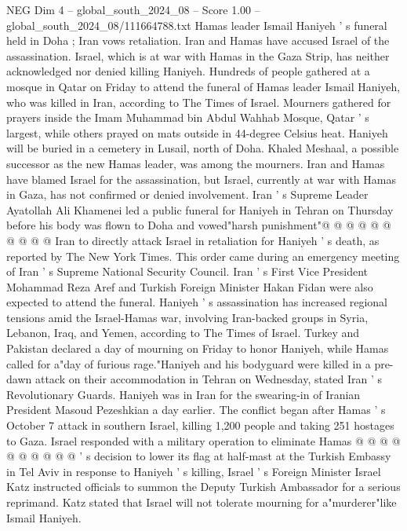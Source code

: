 \begin{textsample}{NEG Dim 4 – global\_south\_2024\_08 – Score 1.00 – global\_south\_2024\_08/111664788.txt}  \label{ex:f4_neg_340}
Hamas leader Ismail Haniyeh ' s funeral held in Doha ; Iran vows retaliation.
Iran and Hamas have accused Israel of the assassination.
Israel, which is at war with Hamas in the Gaza Strip, has neither acknowledged nor denied killing Haniyeh.
Hundreds of people gathered at a mosque in Qatar on Friday to attend the funeral of Hamas leader Ismail Haniyeh, who was killed in Iran, according to The Times of Israel.
Mourners gathered for prayers inside the Imam Muhammad bin Abdul Wahhab Mosque, Qatar ' s largest, while others prayed on mats outside in 44-degree Celsius heat.
Haniyeh will be buried in a cemetery in Lusail, north of Doha.
Khaled Meshaal, a possible successor as the new Hamas leader, was among the mourners.
Iran and Hamas have blamed Israel for the assassination, but Israel, currently at war with Hamas in Gaza, has not confirmed or denied involvement.
Iran ' s Supreme Leader Ayatollah Ali Khamenei led a public funeral for Haniyeh in Tehran on Thursday before his body was flown to Doha and vowed"harsh punishment"@ @ @ @ @ @ @ @ @ @ Iran to directly attack Israel in retaliation for Haniyeh ' s death, as reported by The New York Times.
This order came during an emergency meeting of Iran ' s Supreme National Security Council.
Iran ' s First Vice President Mohammad Reza Aref and Turkish Foreign Minister Hakan Fidan were also expected to attend the funeral.
Haniyeh ' s assassination has increased regional tensions amid the Israel-Hamas war, involving Iran-backed groups in Syria, Lebanon, Iraq, and Yemen, according to The Times of Israel.
Turkey and Pakistan declared a day of mourning on Friday to honor Haniyeh, while Hamas called for a"day of furious rage."Haniyeh and his bodyguard were killed in a pre-dawn attack on their accommodation in Tehran on Wednesday, stated Iran ' s Revolutionary Guards.
Haniyeh was in Iran for the swearing-in of Iranian President Masoud Pezeshkian a day earlier.
The conflict began after Hamas ' s October 7 attack in southern Israel, killing 1,200 people and taking 251 hostages to Gaza.
Israel responded with a military operation to eliminate Hamas @ @ @ @ @ @ @ @ @ @ ' s decision to lower its flag at half-mast at the Turkish Embassy in Tel Aviv in response to Haniyeh ' s killing, Israel ' s Foreign Minister Israel Katz instructed officials to summon the Deputy Turkish Ambassador for a serious reprimand.
Katz stated that Israel will not tolerate mourning for a"murderer"like Ismail Haniyeh.

\end{textsample}
